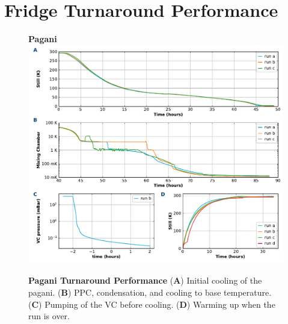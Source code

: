 \documentclass{article}[18pt,A4]
\begin{document}
\newpage
\section{Fridge Turnaround Performance}
\begin{figure}[h]
\centering
\textbf{\color{sectioncolor}Pagani}
\includegraphics{fig/pagani_performance.pdf}
\caption{\textbf{Pagani Turnaround Performance}
(\textbf{\color{sectioncolor}A}) Initial cooling of the pagani.
(\textbf{\color{sectioncolor}B}) PPC, condensation, and cooling to base temperature.
(\textbf{\color{sectioncolor}C}) Pumping of the VC before cooling.
(\textbf{\color{sectioncolor}D}) Warming up when the run is over.
}
\end{figure}
\end{document}
